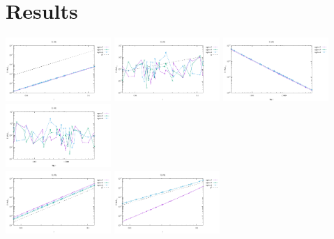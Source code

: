 \newpage
\section*{Results}

\begin{center}
\includegraphics[width=4cm]{python_codes/fieldstone_120/results/Q1Q0-velocity-h.pdf}
\includegraphics[width=4cm]{python_codes/fieldstone_120/results/Q1Q0-pressure-h.pdf}
\includegraphics[width=4cm]{python_codes/fieldstone_120/results/Q1Q0-velocity-Nfem.pdf}
\includegraphics[width=4cm]{python_codes/fieldstone_120/results/Q1Q0-pressure-Nfem.pdf}
\\
\includegraphics[width=4cm]{python_codes/fieldstone_120/results/Q2Q1-velocity-h.pdf}
\includegraphics[width=4cm]{python_codes/fieldstone_120/results/Q2Q1-pressure-h.pdf}

\end{center}
